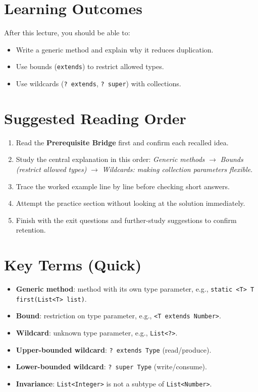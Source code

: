 \documentclass[11pt]{article}
\begin{document}
\section{Learning Outcomes}
After this lecture, you should be able to:
\begin{itemize}
  \item Write a generic method and explain why it reduces duplication.
  \item Use bounds (\texttt{extends}) to restrict allowed types.
  \item Use wildcards (\texttt{? extends}, \texttt{? super}) with collections.
\end{itemize}

\section{Suggested Reading Order}
\begin{enumerate}
  \item Read the \textbf{Prerequisite Bridge} first and confirm each recalled idea.
  \item Study the central explanation in this order: \textit{Generic methods} $\rightarrow$ \textit{Bounds (restrict allowed types)} $\rightarrow$ \textit{Wildcards: making collection parameters flexible}.
  \item Trace the worked example line by line before checking short answers.
  \item Attempt the practice section without looking at the solution immediately.
  \item Finish with the exit questions and further-study suggestions to confirm retention.
\end{enumerate}
\notesources{\OOPSUnitIVSources}

\section{Key Terms (Quick)}
\begin{itemize}
  \item \textbf{Generic method}: method with its own type parameter, e.g., \texttt{static <T> T first(List<T> list)}.
  \item \textbf{Bound}: restriction on type parameter, e.g., \texttt{<T extends Number>}.
  \item \textbf{Wildcard}: unknown type parameter, e.g., \texttt{List<?>}.
  \item \textbf{Upper-bounded wildcard}: \texttt{? extends Type} (read/produce).
  \item \textbf{Lower-bounded wildcard}: \texttt{? super Type} (write/consume).
  \item \textbf{Invariance}: \texttt{List<Integer>} is not a subtype of \texttt{List<Number>}.
\end{itemize}
\end{document}
